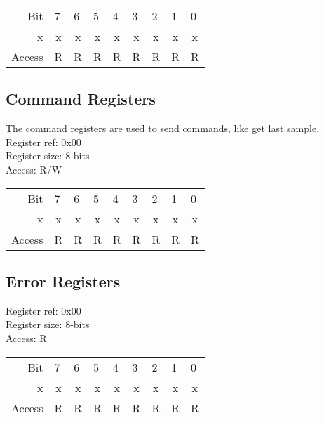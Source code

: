\begin{tabular}{rp{1.25cm}p{1.25cm}p{1.25cm}p{1.25cm}p{1.25cm}p{1.25cm}p{1.25cm}p{1.25cm}}
Bit &
  7 &
  6 &
  5 &
  4 &
  3 &
  2 &
  1 &
  0 \\ \cline{2-9} 

\multicolumn{1}{r|}{x} &
  \multicolumn{1}{c|}{x} &
  \multicolumn{1}{c|}{x} & 
  \multicolumn{1}{c|}{x} &
  \multicolumn{1}{c|}{x} & 
  \multicolumn{1}{c|}{x} & 
  \multicolumn{1}{c|}{x} &
  \multicolumn{1}{c|}{x} &
  \multicolumn{1}{c|}{x} \\\cline{2-9} 
  
Access &
  R &
  R &
  R &
  R &
  R &
  R &
  R &
  R
\end{tabular}

\subsection{Command Registers}
The command registers are used to send commands, like get last sample. \\
Register ref: 0x00\\
Register size: 8-bits\\
Access: R/W\\

\begin{tabular}{rp{1.25cm}p{1.25cm}p{1.25cm}p{1.25cm}p{1.25cm}p{1.25cm}p{1.25cm}p{1.25cm}}
Bit &
  7 &
  6 &
  5 &
  4 &
  3 &
  2 &
  1 &
  0 \\ \cline{2-9} 

\multicolumn{1}{r|}{x} &
  \multicolumn{1}{c|}{x} &
  \multicolumn{1}{c|}{x} & 
  \multicolumn{1}{c|}{x} &
  \multicolumn{1}{c|}{x} & 
  \multicolumn{1}{c|}{x} & 
  \multicolumn{1}{c|}{x} &
  \multicolumn{1}{c|}{x} &
  \multicolumn{1}{c|}{x} \\\cline{2-9} 
  
Access &
  R &
  R &
  R &
  R &
  R &
  R &
  R &
  R
\end{tabular}

\subsection{Error Registers}
Register ref: 0x00\\
Register size: 8-bits\\
Access: R\\

\begin{tabular}{rp{1.25cm}p{1.25cm}p{1.25cm}p{1.25cm}p{1.25cm}p{1.25cm}p{1.25cm}p{1.25cm}}
Bit &
  7 &
  6 &
  5 &
  4 &
  3 &
  2 &
  1 &
  0 \\ \cline{2-9} 

\multicolumn{1}{r|}{x} &
  \multicolumn{1}{c|}{x} &
  \multicolumn{1}{c|}{x} & 
  \multicolumn{1}{c|}{x} &
  \multicolumn{1}{c|}{x} & 
  \multicolumn{1}{c|}{x} & 
  \multicolumn{1}{c|}{x} &
  \multicolumn{1}{c|}{x} &
  \multicolumn{1}{c|}{x} \\\cline{2-9} 
  
Access &
  R &
  R &
  R &
  R &
  R &
  R &
  R &
  R
\end{tabular}

